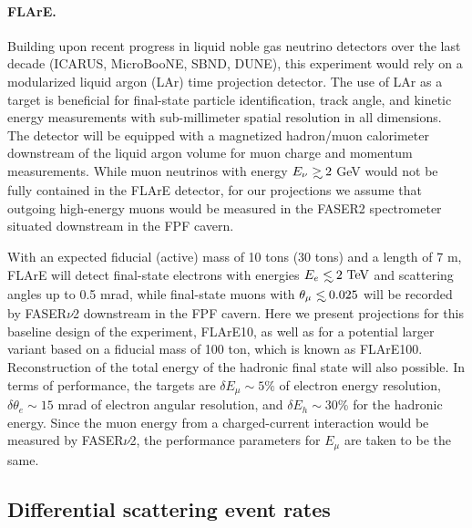  \paragraph{FLArE.}
 Building upon recent progress in liquid noble gas neutrino detectors over the last decade (ICARUS, MicroBooNE, SBND, DUNE), this experiment
 would rely on a modularized liquid argon (LAr) time projection detector.
 The use of LAr as a target is beneficial for final-state particle identification, track angle, and kinetic energy measurements with sub-millimeter spatial resolution in all dimensions.
 The detector will be equipped with a magnetized hadron/muon calorimeter downstream of the liquid argon volume
 for muon charge and momentum measurements.
 While muon neutrinos with energy $E_\nu \gsim 2$ GeV would not be fully
 contained in the  FLArE detector,
for our projections
we assume that outgoing high-energy
muons would be measured in the FASER2 spectrometer
  situated downstream in the FPF cavern.
 
 With an expected fiducial (active) mass of 10 tons (30 tons) and a length of 7 m, FLArE will
 detect final-state electrons with energies $E_{e}\lsim 2~\rm{TeV}$ and
 scattering angles up to 0.5 mrad,  while final-state muons
 with $\theta_\mu \lsim 0.025$ will be recorded by FASER$\nu$2
 downstream in the FPF cavern.
 Here we present  projections for this baseline design of the experiment, FLArE10,
 as well as for a potential larger variant based on a fiducial mass of 100 ton, which
 is known as FLArE100.
 Reconstruction of the total energy of the hadronic final state will also
 possible. 
 In terms of performance, the targets
 are $\delta E_\mu \sim5\%$ of electron energy resolution,
 $\delta \theta_e \sim 15$ mrad of electron angular  resolution,
 and $\delta E_h \sim 30$\% for the hadronic energy.
 Since the muon energy from a charged-current interaction would be measured by FASER$\nu$2, the
 performance parameters for $E_\mu$ are taken to be the same.

\subsection{Differential scattering event rates}
\label{sec:pseudo-data_generation}

